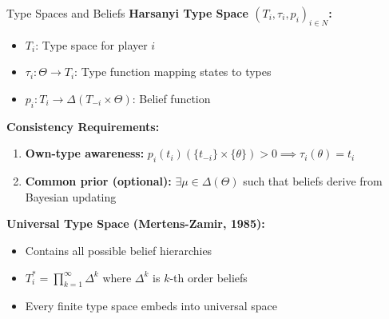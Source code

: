 \documentclass[xcolor={x11names}]{beamer}
\begin{document}
\begin{frame}{Type Spaces and Beliefs}
\textbf{Harsanyi Type Space $(T_i, \tau_i, p_i)_{i \in N}$:}
\begin{itemize}
  \item $T_i$: Type space for player $i$
  \item $\tau_i: \Theta \to T_i$: Type function mapping states to types
  \item $p_i: T_i \to \Delta(T_{-i} \times \Theta)$: Belief function
\end{itemize}

\textbf{Consistency Requirements:}
\begin{enumerate}
  \item \textbf{Own-type awareness:} $p_i(t_i)(\{t_{-i}\} \times \{\theta\}) > 0 \implies \tau_i(\theta) = t_i$
  \item \textbf{Common prior (optional):} $\exists \mu \in \Delta(\Theta)$ such that beliefs derive from Bayesian updating
\end{enumerate}

\textbf{Universal Type Space (Mertens-Zamir, 1985):}
\begin{itemize}
  \item Contains all possible belief hierarchies
  \item $T_i^* = \prod_{k=1}^{\infty} \Delta^k$ where $\Delta^k$ is $k$-th order beliefs
  \item Every finite type space embeds into universal space
\end{itemize}
\end{frame}
\end{document}
